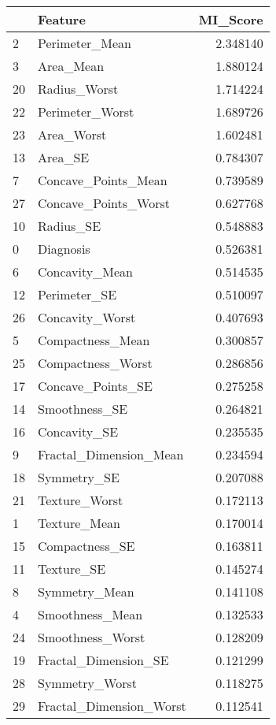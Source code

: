 \begin{tabular}{llr}
\toprule
 & Feature & MI_Score \\
\midrule
2 & Perimeter_Mean & 2.348140 \\
3 & Area_Mean & 1.880124 \\
20 & Radius_Worst & 1.714224 \\
22 & Perimeter_Worst & 1.689726 \\
23 & Area_Worst & 1.602481 \\
13 & Area_SE & 0.784307 \\
7 & Concave_Points_Mean & 0.739589 \\
27 & Concave_Points_Worst & 0.627768 \\
10 & Radius_SE & 0.548883 \\
0 & Diagnosis & 0.526381 \\
6 & Concavity_Mean & 0.514535 \\
12 & Perimeter_SE & 0.510097 \\
26 & Concavity_Worst & 0.407693 \\
5 & Compactness_Mean & 0.300857 \\
25 & Compactness_Worst & 0.286856 \\
17 & Concave_Points_SE & 0.275258 \\
14 & Smoothness_SE & 0.264821 \\
16 & Concavity_SE & 0.235535 \\
9 & Fractal_Dimension_Mean & 0.234594 \\
18 & Symmetry_SE & 0.207088 \\
21 & Texture_Worst & 0.172113 \\
1 & Texture_Mean & 0.170014 \\
15 & Compactness_SE & 0.163811 \\
11 & Texture_SE & 0.145274 \\
8 & Symmetry_Mean & 0.141108 \\
4 & Smoothness_Mean & 0.132533 \\
24 & Smoothness_Worst & 0.128209 \\
19 & Fractal_Dimension_SE & 0.121299 \\
28 & Symmetry_Worst & 0.118275 \\
29 & Fractal_Dimension_Worst & 0.112541 \\
\bottomrule
\end{tabular}
